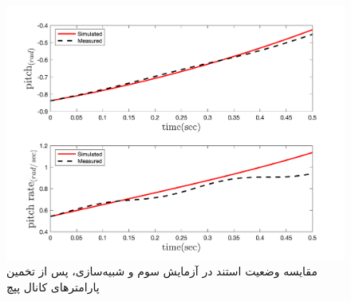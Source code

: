 \begin{figure}[H]
	\includegraphics[width=12cm]{../../Figures/RCP/pitch_parameter_estimation/RCP_pitch_S3.png}
	\centering
	\caption{مقايسه وضعیت استند در  آزمايش سوم و شبیه‌سازی، پس از تخمین پارامترهای کانال پپچ}
	\label{pitch_ps3}
\end{figure}
